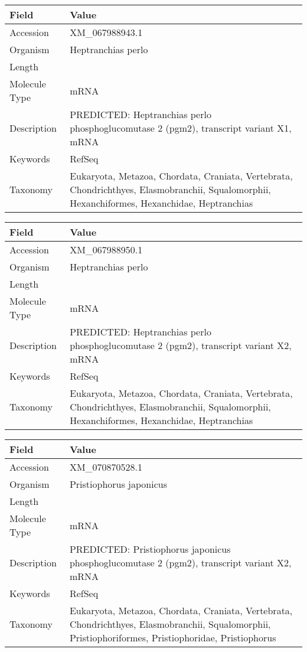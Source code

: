 \documentclass[10pt]{article}
\begin{document}
{\footnotesize
\begin{longtable}{>{\raggedright\arraybackslash}p{4.5cm} >{\raggedright\arraybackslash}p{11.5cm}}
\textbf{Field} & \textbf{Value} \\
\hline
Accession & XM\_067988943.1 \\
Organism & Heptranchias perlo \\
Length & 4553 \\
Molecule Type & mRNA \\
Description & PREDICTED: Heptranchias perlo phosphoglucomutase 2 (pgm2), transcript variant X1, mRNA \\
Keywords & RefSeq \\
Taxonomy & Eukaryota, Metazoa, Chordata, Craniata, Vertebrata, Chondrichthyes, Elasmobranchii, Squalomorphii, Hexanchiformes, Hexanchidae, Heptranchias \\
\end{longtable}
}

{\footnotesize
\begin{longtable}{>{\raggedright\arraybackslash}p{4.5cm} >{\raggedright\arraybackslash}p{11.5cm}}
\textbf{Field} & \textbf{Value} \\
\hline
Accession & XM\_067988950.1 \\
Organism & Heptranchias perlo \\
Length & 4498 \\
Molecule Type & mRNA \\
Description & PREDICTED: Heptranchias perlo phosphoglucomutase 2 (pgm2), transcript variant X2, mRNA \\
Keywords & RefSeq \\
Taxonomy & Eukaryota, Metazoa, Chordata, Craniata, Vertebrata, Chondrichthyes, Elasmobranchii, Squalomorphii, Hexanchiformes, Hexanchidae, Heptranchias \\
\end{longtable}
}

{\footnotesize
\begin{longtable}{>{\raggedright\arraybackslash}p{4.5cm} >{\raggedright\arraybackslash}p{11.5cm}}
\textbf{Field} & \textbf{Value} \\
\hline
Accession & XM\_070870528.1 \\
Organism & Pristiophorus japonicus \\
Length & 4263 \\
Molecule Type & mRNA \\
Description & PREDICTED: Pristiophorus japonicus phosphoglucomutase 2 (pgm2), transcript variant X2, mRNA \\
Keywords & RefSeq \\
Taxonomy & Eukaryota, Metazoa, Chordata, Craniata, Vertebrata, Chondrichthyes, Elasmobranchii, Squalomorphii, Pristiophoriformes, Pristiophoridae, Pristiophorus \\
\end{longtable}
}
\end{document}
